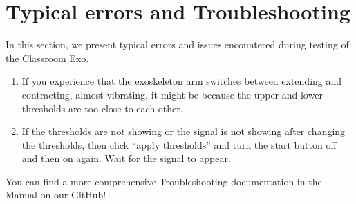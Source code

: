 \section{Typical errors and Troubleshooting}
In this section, we present typical errors and issues encountered during testing of the Classroom Exo. 
\begin{enumerate}[]
	\item If you experience that the exoskeleton arm switches between extending and contracting, almost vibrating, it might be because the upper and lower thresholds are too close to each other. 
	\item If the thresholds are not showing or the signal is not showing after changing the thresholds, then click “apply thresholds” and turn the start button off and then on again. Wait for the signal to appear.
\end{enumerate} 

\begin{tcolorbox}[colback=green!5!white,colframe=green!75!black,title=Hint]
	You can find a more comprehensive Troubleshooting documentation in the Manual on our GitHub!
\end{tcolorbox}
\vspace{0.5cm}







